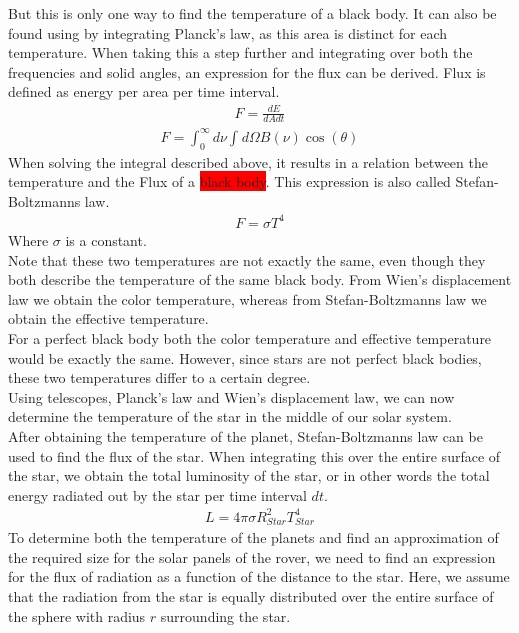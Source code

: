 \documentclass[reprint,english,notitlepage]{revtex4-2}
\begin{document}
But this is only one way to find the temperature of a black body.
It can also be found using by integrating Planck's law, as this area is distinct for each temperature.
When taking this a step further and integrating over both the frequencies and solid angles, an expression for the flux can be derived.
Flux is defined as energy per area per time interval.
\begin{align*}
    F = \frac{dE}{dA dt}
\end{align*}
\begin{align*}
    F = \int_{0}^{\infty} d\nu \int_{}^{} d\Omega B(\nu) \cos\left(\theta\right)
\end{align*}
When solving the integral described above, it results in a relation between the temperature and the Flux of a \colorbox{red}{black body}.
This expression is also called Stefan-Boltzmanns law.
\begin{align*}
    F = \sigma T^4
\end{align*}
Where $\sigma$ is a constant.\\
Note that these two temperatures are not exactly the same, even though they both describe the temperature of the same black body.
From Wien's displacement law we obtain the color temperature, whereas from Stefan-Boltzmanns law we obtain the effective temperature.\\
For a perfect black body both the color temperature and effective temperature would be exactly the same.
However, since stars are not perfect black bodies, these two temperatures differ to a certain degree.\\
Using telescopes, Planck's law and Wien's displacement law, we can now determine the temperature of the star in the middle of our solar system.\\
After obtaining the temperature of the planet, Stefan-Boltzmanns law can be used to find the flux of the star.
When integrating this over the entire surface of the star, we obtain the total luminosity of the star, or in other words the total energy radiated out by the star per time interval $dt$.
\begin{align}
    L = 4 \pi \sigma R_{Star}^2 T_{Star}^4 \label{Luminosity}
\end{align}
To determine both the temperature of the planets and find an approximation of the required size for the solar panels of the rover, we need to find an expression for the flux of radiation as a function of the distance to the star.
Here, we assume that the radiation from the star is equally distributed over the entire surface of the sphere with radius $r$ surrounding the star.\\
\end{document}
